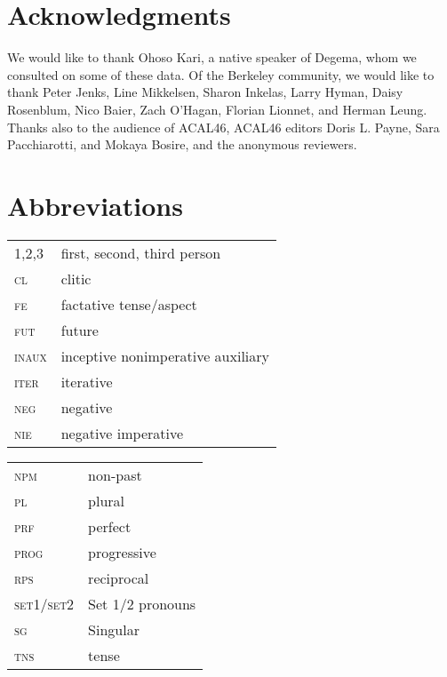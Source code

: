 \documentclass[output=paper]{langsci/langscibook}
\begin{document}
\section*{Acknowledgments}


We would like to thank Ohoso Kari, a native speaker of Degema, whom we consulted on some of these data. Of the Berkeley community, we would like to thank Peter Jenks, Line Mikkelsen, Sharon Inkelas, Larry Hyman, Daisy Rosenblum, Nico Baier, Zach O’Hagan, Florian Lionnet, and Herman Leung. Thanks also to the audience of ACAL46, ACAL46 editors Doris L. Payne, Sara Pacchiarotti, and Mokaya Bosire, and the anonymous reviewers.


\section*{Abbreviations}

\begin{tabularx}{.58\textwidth}{>{\scshape}lQ}
1,2,3 & first, second, third   person \\
cl & clitic \\
fe & factative tense/aspect \\
fut & future \\
inaux & inceptive nonimperative auxiliary \\
iter & iterative \\
neg & negative \\
nie  & negative imperative \\
\end{tabularx}
\begin{tabularx}{.42\textwidth}{>{\scshape}lQ}
npm & non-past \\
pl & plural \\
prf & perfect \\
prog & progressive\\
rps & reciprocal \\
set1/set2 & Set 1/2 pronouns \\
sg & Singular \\
tns & tense \\
\end{tabularx}
 
\printbibliography[heading=subbibliography,notkeyword=this]
\end{document}
